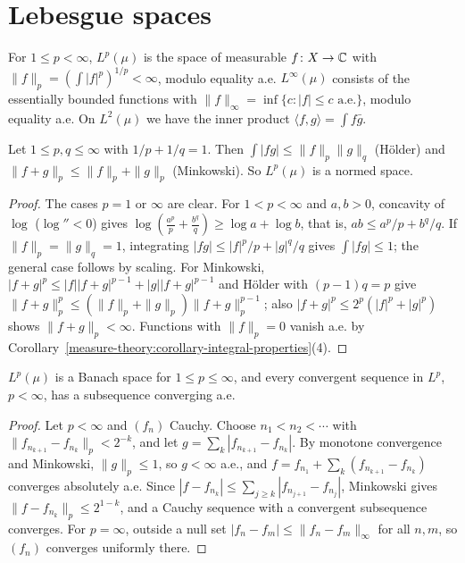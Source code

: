\section{Lebesgue spaces}\label{measure-theory:section-lp}

\begin{definition}\label{measure-theory:definition-lp}
For $1 \leq p < \infty$, $L^p(\mu)$ is the space of measurable $f \colon X \to \mathbb{C}$ with $\|f\|_p = (\int|f|^p)^{1/p} < \infty$, modulo equality a.e. $L^\infty(\mu)$ consists of the essentially bounded
functions with $\|f\|_\infty = \inf\{c : |f| \leq c \text{ a.e.}\}$, modulo equality a.e. On $L^2(\mu)$ we have the inner product $\langle f, g \rangle = \int f\bar g$.
\end{definition}

\begin{proposition}\label{measure-theory:proposition-holder}
Let $1 \leq p, q \leq \infty$ with $1/p + 1/q = 1$. Then $\int|fg| \leq \|f\|_p\|g\|_q$ (H\"older) and $\|f + g\|_p \leq \|f\|_p + \|g\|_p$ (Minkowski). So $L^p(\mu)$ is a normed space.
\end{proposition}

\begin{proof}
The cases $p = 1$ or $\infty$ are clear. For $1 < p < \infty$ and $a, b > 0$, concavity of $\log$ ($\log'' < 0$) gives $\log(\frac{a^p}{p} + \frac{b^q}{q}) \geq \log a + \log b$, that is, $ab \leq a^p/p + b^q/q$. If
$\|f\|_p = \|g\|_q = 1$, integrating $|fg| \leq |f|^p/p + |g|^q/q$ gives $\int|fg| \leq 1$; the general case follows by scaling. For Minkowski, $|f + g|^p \leq |f||f + g|^{p-1} + |g||f + g|^{p-1}$ and
H\"older with $(p - 1)q = p$ give $\|f + g\|_p^p \leq (\|f\|_p + \|g\|_p)\|f + g\|_p^{p-1}$; also $|f + g|^p \leq 2^p(|f|^p + |g|^p)$ shows $\|f + g\|_p < \infty$. Functions with $\|f\|_p = 0$ vanish a.e.
by Corollary~\ref{measure-theory:corollary-integral-properties}(4).
\end{proof}

\begin{theorem}\label{measure-theory:theorem-riesz-fischer}
$L^p(\mu)$ is a Banach space for $1 \leq p \leq \infty$, and every convergent sequence in $L^p$, $p < \infty$, has a subsequence converging a.e.
\end{theorem}

\begin{proof}
Let $p < \infty$ and $(f_n)$ Cauchy. Choose $n_1 < n_2 < \cdots$ with $\|f_{n_{k+1}} - f_{n_k}\|_p < 2^{-k}$, and let $g = \sum_k|f_{n_{k+1}} - f_{n_k}|$. By monotone convergence and Minkowski,
$\|g\|_p \leq 1$, so $g < \infty$ a.e., and $f = f_{n_1} + \sum_k(f_{n_{k+1}} - f_{n_k})$ converges absolutely a.e. Since $|f - f_{n_k}| \leq \sum_{j \geq k}|f_{n_{j+1}} - f_{n_j}|$, Minkowski gives
$\|f - f_{n_k}\|_p \leq 2^{1-k}$, and a Cauchy sequence with a convergent subsequence converges. For $p = \infty$, outside a null set $|f_n - f_m| \leq \|f_n - f_m\|_\infty$ for all $n, m$, so $(f_n)$ converges
uniformly there.
\end{proof}

